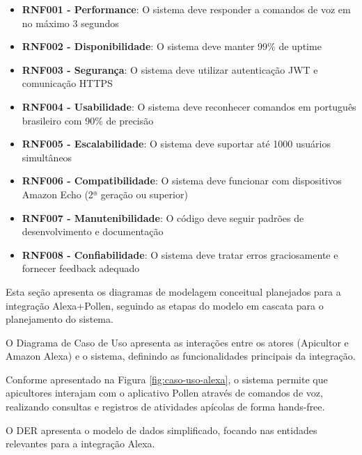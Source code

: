 \begin{itemize}
    \item \textbf{RNF001 - Performance}: O sistema deve responder a comandos de voz em no máximo 3 segundos
    \item \textbf{RNF002 - Disponibilidade}: O sistema deve manter 99\% de uptime
    \item \textbf{RNF003 - Segurança}: O sistema deve utilizar autenticação JWT e comunicação HTTPS
    \item \textbf{RNF004 - Usabilidade}: O sistema deve reconhecer comandos em português brasileiro com 90\% de precisão
    \item \textbf{RNF005 - Escalabilidade}: O sistema deve suportar até 1000 usuários simultâneos
    \item \textbf{RNF006 - Compatibilidade}: O sistema deve funcionar com dispositivos Amazon Echo (2ª geração ou superior)
    \item \textbf{RNF007 - Manutenibilidade}: O código deve seguir padrões de desenvolvimento e documentação
    \item \textbf{RNF008 - Confiabilidade}: O sistema deve tratar erros graciosamente e fornecer feedback adequado
\end{itemize}

\label{sec:modelagem-sistema}

Esta seção apresenta os diagramas de modelagem conceitual planejados para a integração Alexa+Pollen, seguindo as etapas do modelo em cascata para o planejamento do sistema.


O Diagrama de Caso de Uso apresenta as interações entre os atores (Apicultor e Amazon Alexa) e o sistema, definindo as funcionalidades principais da integração.



Conforme apresentado na Figura \ref{fig:caso-uso-alexa}, o sistema permite que apicultores interajam com o aplicativo Pollen através de comandos de voz, realizando consultas e registros de atividades apícolas de forma hands-free.


O DER apresenta o modelo de dados simplificado, focando nas entidades relevantes para a integração Alexa.



